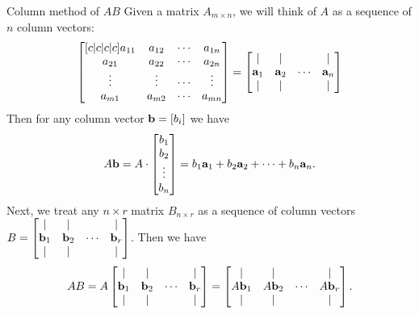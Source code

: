 \begin{frame}{Column method of $AB$}\footnotesize
Given a matrix $A_{m\times n}$, we will think of $A$ as a sequence of $n$ column vectors:
\[
\begin{bmatrix}[c|c|c|c]
a_{11}&a_{12}&\cdots &a_{1n}\\
a_{21}&a_{22}&\cdots &a_{2n}\\
\vdots&\vdots &\cdots&\vdots \\
a_{m1}&a_{m2}&\cdots&a_{mn}
\end{bmatrix}
=
\begin{bmatrix}
\vert &\vert & & \vert\\
{\mathbf a}_1&{\mathbf a}_2&\cdots &{\mathbf a}_n\\
\vert&\vert & &\vert
\end{bmatrix}
\]
\pause Then for any column vector ${\mathbf b}=[b_{i}]$ we have  
\[
A{\mathbf b}=A\cdot\begin{bmatrix}b_1\\b_2\\ \vdots \\b_n\end{bmatrix}
=
b_1{\mathbf a}_1+b_2{\mathbf a}_2+\cdots +b_n{\mathbf a}_n.
\]
\pause Next, we treat any $n\times r$ matrix $B_{n\times r}$ as a sequence of column vectors $B=\begin{bmatrix}\vert &\vert & &\vert \\ {\mathbf b}_1&{\mathbf b}_2&\cdots&{\mathbf b}_r\\ \vert &\vert & &\vert \end{bmatrix}$. Then we have 
\[
AB=A\begin{bmatrix}\vert &\vert & &\vert \\ {\mathbf b}_1&{\mathbf b}_2&\cdots&{\mathbf b}_r\\ \vert &\vert & &\vert \end{bmatrix}=\begin{bmatrix}\vert &\vert & &\vert \\ A{\mathbf b}_1&A{\mathbf b}_2&\cdots&A{\mathbf b}_r\\ \vert & \vert & & \vert \end{bmatrix}.
\]
\end{frame}
